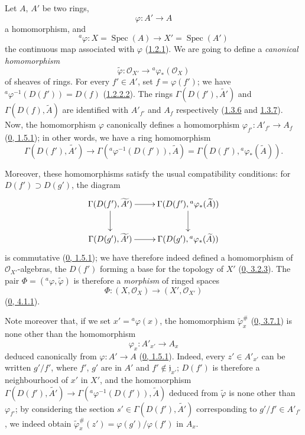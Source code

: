 \begin{env}[1.6.1]
\label{I.1.6.1}
Let $A$, $A'$ be two rings,
\[
  \varphi:A'\to A
\]
a homomorphism, and
\[
  {}^a\varphi:X=\operatorname{Spec}(A)\to
  X'=\operatorname{Spec}(A')
\]
the continuous map associated with $\varphi$
(\hyperref[I.1.2.1]{1.2.1}). We are going to define a
\emph{canonical homomorphism}
\[
  \widetilde{\varphi}:\mathscr{O}_{X'}\to
  {}^a\varphi_*(\mathscr{O}_X)
\]
of sheaves of rings. For every $f'\in A'$, set $f=\varphi(f')$; we have
${}^a\varphi^{-1}(D(f'))=D(f)$
(\hyperref[I.1.2.2.2]{1.2.2.2}). The rings
$\Gamma(D(f'),\widetilde{A'})$ and $\Gamma(D(f),\widetilde{A})$
are identified with $A'_{f'}$ and $A_f$ respectively
(\hyperref[I.1.3.6]{1.3.6} and \hyperref[I.1.3.7]{1.3.7}). Now,
the homomorphism $\varphi$ canonically defines a homomorphism
$\varphi_{f'}:A'_{f'}\to A_f$
(\hyperref[0.1.5.1]{0, 1.5.1}); in other words, we have a ring
homomorphism
\[
  \Gamma(D(f'),\widetilde{A'})\to
  \Gamma({}^a\varphi^{-1}(D(f')),\widetilde{A})
  =\Gamma(D(f'),{}^a\varphi_*(\widetilde{A})).
\]

Moreover, these homomorphisms satisfy the usual compatibility
conditions: for $D(f')\supset D(g')$, the diagram
\[
  \xymatrix{
    \Gamma(D(f'),\widetilde{A'})\ar[r]\ar[d] &
    \Gamma(D(f'),{}^a\varphi_*(\widetilde{A}))\ar[d]\\
    \Gamma(D(g'),\widetilde{A'})\ar[r] &
    \Gamma(D(g'),{}^a\varphi_*(\widetilde{A}))
  }
\]
is commutative (\hyperref[0.1.5.1]{0, 1.5.1}); we have therefore indeed
defined a homomorphism of $\mathscr{O}_{X'}$-algebras, the $D(f')$ forming a
base for the topology of $X'$ (\hyperref[0.3.2.3]{0, 3.2.3}). The pair
$\Phi=({}^a\varphi,\widetilde{\varphi})$ is therefore a \emph{morphism}
of ringed spaces
\[
  \Phi:(X,\mathscr{O}_X)\to(X',\mathscr{O}_{X'})
\]
(\hyperref[0.4.1.1]{0, 4.1.1}).

Note moreover that, if we set $x'={}^a\varphi(x)$, the homomorphism
$\widetilde{\varphi}_x^\#$ (\hyperref[0.3.7.1]{0, 3.7.1}) is none other
than the homomorphism
\[
  \varphi_x:A'_{x'}\to A_x
\]
deduced canonically from $\varphi:A'\to A$
(\hyperref[0.1.5.1]{0, 1.5.1}). Indeed, every $z'\in A'_{x'}$
can be written $g'/f'$, where $f'$, $g'$ are in $A'$ and
$f'\notin\mathfrak{j}_{x'}$; $D(f')$ is therefore a neighbourhood of $x'$ in
$X'$, and the homomorphism
$\Gamma(D(f'),\widetilde{A'})\to
\Gamma({}^a\varphi^{-1}(D(f')),\widetilde{A})$ deduced from
$\widetilde{\varphi}$ is none other than $\varphi_{f'}$; by considering the
section $s'\in\Gamma(D(f'),\widetilde{A'})$ corresponding to
$g'/f'\in A'_{f'}$, we indeed obtain
$\widetilde{\varphi}_x^\#(z')=\varphi(g')/\varphi(f')$ in $A_x$.
\end{env}


